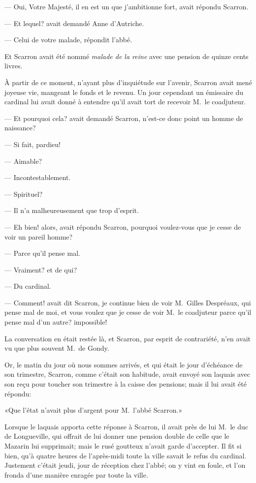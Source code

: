 — Oui, Votre Majesté, il en est un que j'ambitionne fort, avait répondu Scarron.

— Et lequel? avait demandé Anne d'Autriche.

— Celui de votre malade, répondit l'abbé.

Et Scarron avait été nommé \textit{malade de la reine} avec une pension de quinze cents livres.

À partir de ce moment, n'ayant plus d'inquiétude sur l'avenir, Scarron avait mené joyeuse vie, mangeant le fonds et le revenu.
Un jour cependant un émissaire du cardinal lui avait donné à entendre qu'il avait tort de recevoir M.~le coadjuteur.

— Et pourquoi cela? avait demandé Scarron, n'est-ce donc point un homme de naissance?

— Si fait, pardieu!

— Aimable?

— Incontestablement.

— Spirituel?

— Il n'a malheureusement que trop d'esprit.

— Eh bien! alors, avait répondu Scarron, pourquoi voulez-vous que je cesse de voir un pareil homme?

— Parce qu'il pense mal.

— Vraiment? et de qui?

— Du cardinal.

— Comment! avait dit Scarron, je continue bien de voir M.~Gilles Despréaux, qui pense mal de moi, et vous voulez que je cesse de voir M.~le coadjuteur parce qu'il pense mal d'un autre? impossible!

La conversation en était restée là, et Scarron, par esprit de contrariété, n'en avait vu que plus souvent M.~de Gondy.

Or, le matin du jour où nous sommes arrivés, et qui était le jour d'échéance de son trimestre, Scarron, comme c'était son habitude, avait envoyé son laquais avec son reçu pour toucher son trimestre à la caisse des pensions; mais il lui avait été répondu:

«Que l'état n'avait plus d'argent pour M.~l'abbé Scarron.»

Lorsque le laquais apporta cette réponse à Scarron, il avait près de lui M.~le duc de Longueville, qui offrait de lui donner une pension double de celle que le Mazarin lui supprimait; mais le rusé goutteux n'avait garde d'accepter. Il fit si bien, qu'à quatre heures de l'après-midi toute la ville savait le refus du cardinal. Justement c'était jeudi, jour de réception chez l'abbé; on y vint en foule, et l'on fronda d'une manière enragée par toute la ville.

